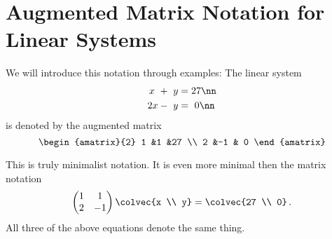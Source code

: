 \section{Augmented Matrix Notation for Linear Systems}

We will introduce this notation through examples: 
The linear system 
\begin{align}
	x\ +\ y & = 27\nn \\
	2x-\ y & = \  0\nn \,
\end{align}
is denoted by the augmented matrix
\[
\begin{amatrix}{2}
1 &1 &27 \\ 2 &-1 & 0
\end{amatrix}
\]

\noindent
This is truly minimalist notation. It is even more minimal then the matrix notation  
\begin{equation*}
    \begin{pmatrix}
      1             &1  \\
      2             &-1
    \end{pmatrix}
  \colvec{x \\ y}
  =
  \colvec{27 \\ 0}\, .
\end{equation*}
All three of the above equations denote the same thing. 



